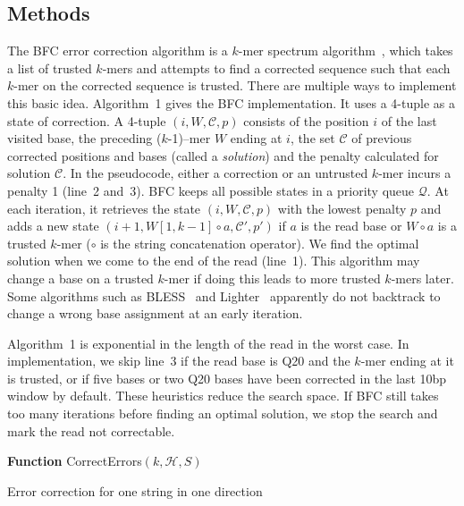 \documentclass{bioinfo}
\begin{document}
\begin{methods}
\section{Methods}
The BFC error correction algorithm is a $k$-mer spectrum
algorithm~\citep{Pevzner:2001vn}, which takes a list of trusted $k$-mers and
attempts to find a corrected sequence such that each $k$-mer on the corrected
sequence is trusted. There are multiple ways to implement this basic idea.
Algorithm~1 gives the BFC implementation. It uses a 4-tuple as a state of
correction. A 4-tuple $(i,W,\mathcal{C},p)$ consists of the position $i$ of the
last visited base, the preceding \mbox{($k$-1)--mer} $W$ ending at $i$, the set
$\mathcal{C}$ of previous corrected positions and bases (called a
\emph{solution}) and the penalty calculated for solution $\mathcal{C}$. In the
pseudocode, either a correction or an untrusted $k$-mer incurs a penalty 1
(line~2 and~3). BFC keeps all possible states in a priority queue
$\mathcal{Q}$. At each iteration, it retrieves the state $(i,W,\mathcal{C},p)$
with the lowest penalty $p$ and adds a new state $(i+1,W[1,k-1]\circ
a,\mathcal{C}',p')$ if $a$ is the read base or $W\circ a$ is a trusted $k$-mer
($\circ$ is the string concatenation operator). We find the optimal solution
when we come to the end of the read (line~1). This algorithm may change a base
on a trusted $k$-mer if doing this leads to more trusted $k$-mers later.  Some
algorithms such as BLESS~\citep{Heo:2014aa} and Lighter~\citep{Song:2014aa}
apparently do not backtrack to change a wrong base assignment at an early
iteration.

Algorithm~1 is exponential in the length of the read in the worst case.  In
implementation, we skip line~3 if the read base is Q20 and the $k$-mer ending
at it is trusted, or if five bases or two Q20 bases have been corrected in the
last 10bp window by default. These heuristics reduce the search space.  If BFC
still takes too many iterations before finding an optimal solution, we stop the
search and mark the read not correctable.

\begin{algorithm}[ht]
\DontPrintSemicolon
\footnotesize
{}
\BlankLine
\textbf{Function} {\sc CorrectErrors}$(k, \mathcal{H}, S)$
\caption{Error correction for one string in one direction}
\end{algorithm}

\end{methods}
\end{document}
